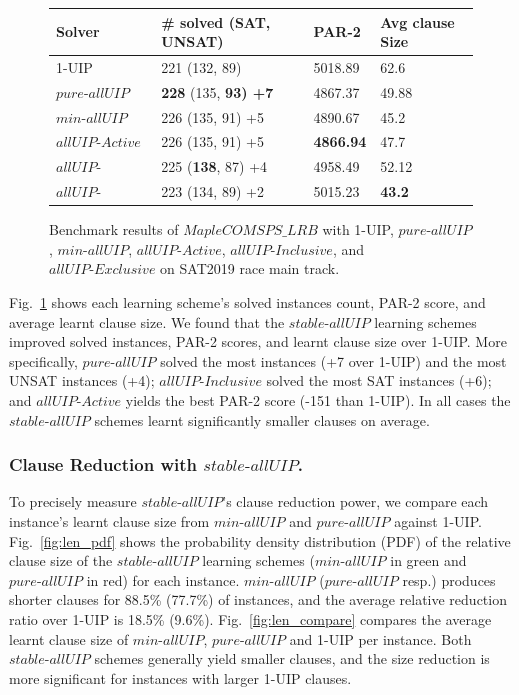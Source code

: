 \documentclass[runningheads]{llncs}
\newcommand{\allUip}{\textit{stable-allUIP}}
\newcommand{\allUipPure}{\textit{pure-allUIP}\xspace}
\newcommand{\allUipMin}{\textit{min-allUIP}\xspace}
\newcommand{\allUipAct}{\textit{allUIP-Active}}
\newcommand{\allUipIn}{\textit{allUIP-Inclusive}}
\newcommand{\allUipEx}{\textit{allUIP-Exclusive}}
\newcommand{\MapleBase}{\textit{MapleCOMSPS\_LRB}}
\begin{document}
\begin{figure} 
\begin{center}
\begin{tabular}{ | m{3.5cm} | m{4cm}| m{2cm} | m{2.75cm} |  } 
\hline
Solver & \# solved (SAT, UNSAT) & PAR-2 & Avg clause Size \\ 
\hline
1-UIP & 221 (132, 89)  & 5018.89 & 62.6  \\ 
\hline
$\allUipPure$ &\textbf{228} (135, \bf{93}) +7 & 4867.37 & 49.88 \\
\hline
$\allUipMin$ & 226 (135, 91) +5 & 4890.67 & 45.2 \\ 
\hline
$\allUipAct$ & 226 (135, 91)  +5 & \textbf{4866.94} & 47.7 \\
\hline
$\allUipIn$ & 225 (\textbf{138}, 87) +4 & 4958.49 & 52.12 \\
\hline
$\allUipEx$ & 223 (134, 89) +2& 5015.23& \textbf{43.2} \\
\hline
\end{tabular}
\end{center}
\caption{Benchmark results of $\MapleBase$ with 1-UIP, $\allUipPure$, $\allUipMin$, $\allUipAct$,
$\allUipIn$, and $\allUipEx$ on SAT2019 race main track.}
\label{fig:t4}
\end{figure}


Fig.~\ref{fig:t4} shows each learning scheme's solved instances count,
PAR-2 score, and average learnt clause size. We found that the
$\allUip$ learning schemes improved solved instances, PAR-2 scores,
and learnt clause size over 1-UIP. More specifically, $\allUipPure$
solved the most instances (+7 over 1-UIP) and the most UNSAT instances
(+4); $\allUipIn$ solved the most SAT instances (+6); and $\allUipAct$
yields the best PAR-2 score (-151 than 1-UIP). In all cases the
$\allUip$ schemes learnt significantly smaller clauses on average.

\subsubsection{Clause Reduction with $\allUip$.}
To precisely measure $\allUip$'s clause reduction power, we compare
each instance's learnt clause size from $\allUipMin$ and $\allUipPure$
against 1-UIP. Fig.~\ref{fig:len_pdf} shows the probability density
distribution (PDF) of the relative clause size of the $\allUip$
learning schemes ($\allUipMin$ in green and $\allUipPure$ in red) for
each instance. $\allUipMin$ ($\allUipPure$ resp.) produces shorter
clauses for 88.5\% (77.7\%) of instances, and the average relative
reduction ratio over 1-UIP is 18.5\%
(9.6\%). Fig.~\ref{fig:len_compare} compares the average learnt
clause size of $\allUipMin$, $\allUipPure$ and 1-UIP per instance.
Both $\allUip$ schemes generally yield smaller clauses, and the size
reduction is more significant for instances with larger 1-UIP clauses.
\end{document}
